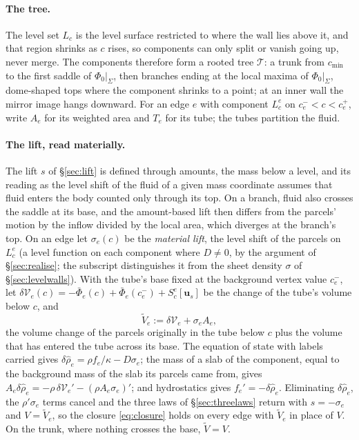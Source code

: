 \documentclass[11pt]{article}
\theoremstyle{definition}
\theoremstyle{remark}
\newcommand{\bu}{\mathbf{u}}
\newcommand{\Vol}{\mathcal V}
\newcommand{\Vt}{\tilde V}
\begin{document}
\paragraph{The tree.} The level set $L_c$ is the level surface
restricted to where the wall lies above it, and that region shrinks as
$c$ rises, so components can only split or vanish going up, never
merge. The components therefore form a rooted tree $\mathcal T$: a
trunk from $c_{\min}$ to the first saddle of $\Phi_0|_\Sigma$, then
branches ending at the local maxima of $\Phi_0|_\Sigma$, dome-shaped
tops where the component shrinks to a point; at an inner wall the
mirror image hangs downward. For an edge $e$ with component $L^e_c$ on
$c_e^- < c < c_e^+$, write $A_e$ for its weighted area and $T_e$ for its
tube; the tubes partition the fluid.

\paragraph{The lift, read materially.} The lift $s$ of
\S\ref{sec:lift} is defined through amounts, the mass below a level,
and its reading as the level shift of the fluid of a given mass
coordinate assumes that fluid enters the body counted only through its
top. On a branch, fluid also crosses the saddle at its base, and the
amount-based lift then differs from the parcels' motion by the inflow
divided by the local area, which diverges at the branch's top. On an
edge let $\sigma_e(c)$ be the \emph{material lift}, the level shift of
the parcels on $L^e_c$ (a level function on each component where $D
\ne 0$, by the argument of \S\ref{sec:realise}; the subscript
distinguishes it from the sheet density $\sigma$ of
\S\ref{sec:levelwalls}). With the tube's base fixed at the background
vertex value $c_e^-$, let $\delta\Vol_e(c) = -\bar\Phi_e(c) +
\bar\Phi_e(c_e^-) + S^e_c[\bu_s]$ be the change of the tube's volume
below $c$, and
\begin{equation*}
  \Vt_e := \delta\Vol_e + \sigma_eA_e ,
\end{equation*}
the volume change of the parcels originally in the tube below $c$ plus
the volume that has entered the tube across its base. The equation of
state with labels carried gives $\delta\hat\rho_e = \rho f_e/\kappa -
D\sigma_e$; the mass of a slab of the component, equal to the
background mass of the slab its parcels came from, gives
$A_e\delta\hat\rho_e = -\rho\,\delta\Vol_e' - (\rho A_e\sigma_e)'$; and
hydrostatics gives $f_e' = -\delta\hat\rho_e$. Eliminating
$\delta\hat\rho_e$, the $\rho'\sigma_e$ terms cancel and the three laws
of \S\ref{sec:threelaws} return with $s = -\sigma_e$ and $V = \Vt_e$, so
the closure \eqref{eq:closure} holds on every edge with $\Vt_e$ in
place of $V$. On the trunk, where nothing crosses the base, $\Vt = V$.
\end{document}
